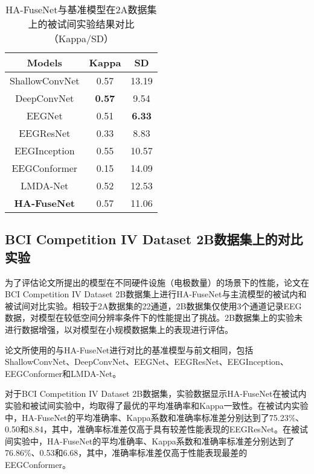 \begin{table}[ht]
    \centering
    \caption{HA-FuseNet与基准模型在2A数据集上的被试间实验结果对比（Kappa/SD）}
    \label{tab:2acomparecrosssd}
    \begin{tabularx}{\textwidth}{CCC}
      \toprule
      Models & Kappa & SD \\
      \midrule
      ShallowConvNet\cite{schirrmeister2017deep} &0.57&13.19 \\
      DeepConvNet\cite{schirrmeister2017deep} &\textbf{0.57} &9.54\\
      EEGNet\cite{lawhern2018eegnet} &0.51& \textbf{6.33}\\
      EEGResNet\cite{HBM:HBM23730} &0.33&8.83\\
      EEGInception\cite{zhang2021eeg} &0.55&10.57\\
      EEGConformer\cite{song2022eeg}&0.15&14.09 \\
      LMDA-Net\cite{miao2023lmda} &0.52&12.53\\
      \midrule 
      \textbf{HA-FuseNet} &0.57&11.06\\
      \bottomrule
    \end{tabularx}
\end{table}

\subsection{BCI Competition IV Dataset 2B数据集上的对比实验}

为了评估论文所提出的模型在不同硬件设施（电极数量）的场景下的性能，论文在BCI Competition IV Dataset 2B数据集上进行HA-FuseNet与主流模型的被试内和被试间对比实验。相较于2A数据集的22通道，2B数据集仅使用3个通道记录EEG数据，对模型在较低空间分辨率条件下的性能提出了挑战。2B数据集上的实验未进行数据增强，以对模型在小规模数据集上的表现进行评估。

论文所使用的与HA-FuseNet进行对比的基准模型与前文相同，包括ShallowConvNet\cite{schirrmeister2017deep}、DeepConvNet\cite{schirrmeister2017deep}、EEGNet\cite{lawhern2018eegnet}、EEGResNet\cite{HBM:HBM23730}、EEGInception\cite{zhang2021eeg}、EEGConformer\cite{song2022eeg}和LMDA-Net\cite{miao2023lmda}。

对于BCI Competition IV Dataset 2B数据集，实验数据显示HA-FuseNet在被试内实验和被试间实验中，均取得了最优的平均准确率和Kappa一致性。在被试内实验中，HA-FuseNet的平均准确率、Kappa系数和准确率标准差分别达到了75.23\%、0.50和8.84，其中，准确率标准差仅高于具有较差性能表现的EEGResNet。在被试间实验中，HA-FuseNet的平均准确率、Kappa系数和准确率标准差分别达到了76.86\%、0.53和6.68，其中，准确率标准差仅高于性能表现最差的EEGConformer。


